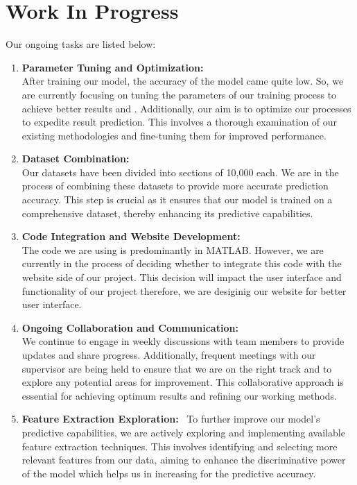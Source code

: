 \chapter{Work In Progress}
Our ongoing tasks are listed below:
\begin{enumerate}[label=\arabic*.]
    \item \textbf{Parameter Tuning and Optimization:} \\
    After training our model, the accuracy of the model came quite low. So, we are currently focusing on tuning the parameters of our training process to achieve better results and . Additionally, our aim is to optimize our processes to expedite result prediction. This involves a thorough examination of our existing methodologies and fine-tuning them for improved performance.
    
    \item \textbf{Dataset Combination:} \\
    Our datasets have been divided into sections of 10,000 each. We are in the process of combining these datasets to provide more accurate prediction accuracy. This step is crucial as it ensures that our model is trained on a comprehensive dataset, thereby enhancing its predictive capabilities.
    
    \item \textbf{Code Integration and Website Development:} \\
    The code we are using is predominantly in MATLAB. However, we are currently in the process of deciding whether to integrate this code with the website side of our project. This decision will impact the user interface and functionality of our project therefore, we are desiginig our website for better user interface.
    
    \item \textbf{Ongoing Collaboration and Communication:} \\
    We continue to engage in weekly discussions with team members to provide updates and share progress. Additionally, frequent meetings with our supervisor are being held to ensure that we are on the right track and to explore any potential areas for improvement. This collaborative approach is essential for achieving optimum results and refining our working methods.

    
    \item \textbf{Feature Extraction Exploration:} \
    To further improve our model's predictive capabilities, we are actively exploring and implementing available  feature extraction techniques. This involves identifying and selecting more relevant features from our data, aiming to enhance the discriminative power of the model which helps us in increasing for the predictive accuracy.


\end{enumerate}